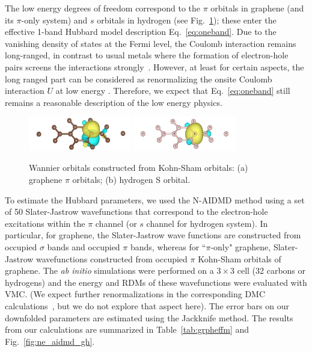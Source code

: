 The low energy degrees of freedom correspond to the $\pi$ orbitals in graphene (and its $\pi$-only system) 
and $s$ orbitals in hydrogen (see Fig.~\ref{fig:honeycomb_wan}); these enter the effective 
1-band Hubbard model description Eq.~\eqref{eq:oneband}. Due to the vanishing density of states at 
the Fermi level, the Coulomb interaction remains long-ranged, in contrast to usual 
metals where the formation of electron-hole pairs screens the interactions strongly~\cite{Zheng2016}. 
However, at least for certain aspects, the long ranged part can be considered as renormalizing the 
onsite Coulomb interaction $U$ at low energy \cite{Schuler2013, Changlani2015}. 
Therefore, we expect that Eq.~\eqref{eq:oneband} still remains a reasonable description of the low energy physics. 
\begin{figure}[hbt]
\includegraphics[width=0.40\textwidth]{./Figures/c_pi.png}
\includegraphics[width=0.40\textwidth]{./Figures/h_wan.png}
\caption{Wannier orbitals constructed from Kohn-Sham orbitals: (a) graphene $\pi$ orbitals; (b) hydrogen S orbital. }
\label{fig:honeycomb_wan}
\end{figure}

To estimate the Hubbard parameters, we used the N-AIDMD method using a set of 50 Slater-Jastrow wavefunctions that correspond 
to the electron-hole excitations within the $\pi$ channel (or $s$ channel for hydrogen system). In particular, for graphene, 
the Slater-Jastrow wave functions are constructed from occupied $\sigma$ bands and occupied $\pi$ bands, whereas for ``$\pi$-only" graphene, 
Slater-Jastrow wavefunctions constructed from occupied $\pi$ Kohn-Sham orbitals of graphene. The \textit{ab initio} simulations 
were performed on a $3\times3$ cell (32 carbons or hydrogens) and the energy and RDMs of these wavefunctions were
evaluated with VMC. (We expect further renormalizations in the corresponding DMC calculations~\cite{Changlani2015}, 
but we do not explore that aspect here). The error bars on our downfolded parameters are estimated using the Jackknife method. 
The results from our calculations are summarized in Table~\ref{tab:grpheffm} 
and Fig.~\ref{fig:ne_aidmd_gh}.%

